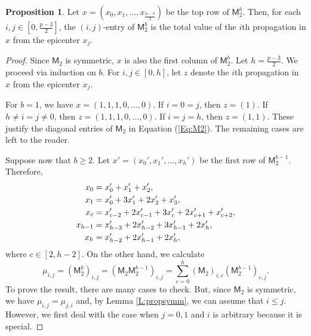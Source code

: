 \documentclass[12pt,reqno]{amsart}
\renewcommand{\geq}{\geqslant}
\renewcommand{\leq}{\leqslant}
\newcommand{\M}{\mathsf{M}}
\theoremstyle{definition}
\newtheorem{prop}[thm]{Proposition}
\numberwithin{equation}{section}
\begin{document}
\begin{prop}\label{P:propsymm}
    Let $x=(x_0,x_1,\ldots,x_{\frac{p-3}{2}})$ be the top row of $\M_2^b$. Then, for each $i,j\in [0,\frac{p-3}{2}]$, the $(i,j)$-entry of $\M_2^b$ is the total value of the $i$th propagation in $x$ from the epicenter $x_j$.
\end{prop}
\begin{proof}
    Since $\M_2$ is symmetric, $x$ is also the first column of $\M_2^b$. Let $h=\frac{p-3}{2}$. We proceed via induction on $b$. For $i,j\in [0,h]$, let $z$ denote the $i$th propagation in $x$ from the epicenter $x_j$. 
    
    For $b=1$, we have $x=(1,1,1,0,\ldots,0)$. If $i=0=j$, then $z=(1)$. If $h\neq i=j\neq 0$, then $z=(1,1,1,0,\ldots,0)$. If $i=j=h$, then $z=(1,1)$. These justify the diagonal entries of $\M_2$ in Equation (\ref{Eq:M2}). The remaining cases are left to the reader. 

    Suppose now that $b\geq 2$. Let $x'=(x_0',x_1',\ldots,x_h')$ be the first row of $\M_2^{b-1}$. Therefore, 
    \begin{align}\label{Eq:xx'}
        x_0&=x_0'+x_1'+x_2',\notag\\
        x_1&=x_0'+3x_1'+2x_2'+x_3',\notag\\
        x_c&=x_{c-2}'+2x_{c-1}'+ 3x_c'+2x_{c+1}'+x_{c+2}',\notag\\
        x_{h-1}&=x_{h-3}'+2x_{h-2}'+3x_{h-1}'+2x_h',\notag\\
        x_h&=x_{h-2}'+2x_{h-1}'+2x_h',
    \end{align} where $c\in [2,h-2]$. On the other hand, we calculate \[\mu_{i,j}=(\M_2^b)_{i,j}=(\M_2\M_2^{b-1})_{i,j}= \sum_{c=0}^{h}(\M_2)_{i,c}(\M_2^{b-1})_{c,j}.\] To prove the result, there are many cases to check. But, since $\M_2$ is symmetric, we have $\mu_{i,j}=\mu_{j,i}$ and, by Lemma \ref{L:propsymm}, we can assume that $i\leq j$. However, we first deal with the case when $j=0,1$ and $i$ is arbitrary because it is special. 
    

\end{proof}
\end{document}
